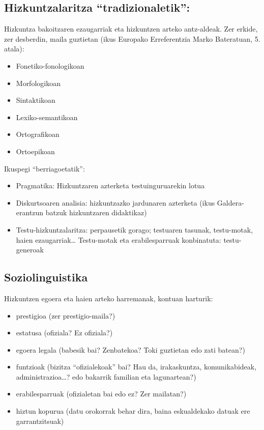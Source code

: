 \documentclass[
]{book}
\providecommand{\tightlist}{%
  \setlength{\itemsep}{0pt}\setlength{\parskip}{0pt}}
\begin{document}
\hypertarget{hizkuntzalaritza-tradizionaletik}{%
\subsection{Hizkuntzalaritza ``tradizionaletik'':}\label{hizkuntzalaritza-tradizionaletik}}

Hizkuntza bakoitzaren ezaugarriak eta hizkuntzen arteko antz-aldeak. Zer erkide, zer desberdin, maila guztietan (ikus Europako Erreferentzia Marko Bateratuan, 5. atala):

\begin{itemize}
\tightlist
\item
  Fonetiko-fonologikoan
\item
  Morfologikoan
\item
  Sintaktikoan
\item
  Lexiko-semantikoan
\item
  Ortografikoan
\item
  Ortoepikoan
\end{itemize}

Ikuspegi ``berriagoetatik'':

\begin{itemize}
\tightlist
\item
  Pragmatika: Hizkuntzaren azterketa testuinguruarekin lotua
\item
  Diskurtsoaren analisia: hizkuntzazko jardunaren azterketa (ikus Galdera-erantzun batzuk hizkuntzaren didaktikaz)
\item
  Testu-hizkuntzalaritza: perpausetik gorago; testuaren tasunak, testu-motak, haien ezaugarriak\ldots{}
  Testu-motak eta erabilesparruak konbinatuta: testu-generoak
\end{itemize}

\hypertarget{soziolinguistika}{%
\subsection{Soziolinguistika}\label{soziolinguistika}}

Hizkuntzen egoera eta haien arteko harremanak, kontuan harturik:

\begin{itemize}
\tightlist
\item
  prestigioa (zer prestigio-maila?)
\item
  estatusa (ofiziala? Ez ofiziala?)
\item
  egoera legala (babesik bai? Zenbatekoa? Toki guztietan edo zati batean?)
\item
  funtzioak (bizitza ``ofizialekoak'' bai? Hau da, irakaskuntza, komunikabideak, administrazioa\ldots? edo bakarrik familian eta lagunartean?)
\item
  erabilesparruak (ofizialetan bai edo ez? Zer mailatan?)
\item
  hiztun kopurua (datu orokorrak behar dira, baina eskualdekako datuak ere garrantzitsuak)
\end{itemize}
\end{document}
